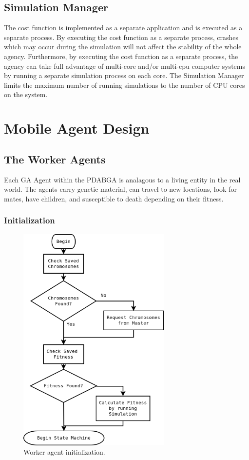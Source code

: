     \subsection{Simulation Manager}
      The cost function is implemented as a separate application and is executed
        as a separate process. 
      By executing the cost function as a separate process, crashes which may occur
        during the simulation will not affect the stability of the whole agency. 
      Furthermore, by executing the cost function as a separate process, the agency
        can take full advantage of multi-core and/or multi-cpu computer systems by
        running a separate simulation process on each core. 
      The Simulation Manager limits the maximum number of running simulations to the
        number of CPU cores on the system.


  \section{Mobile Agent Design}
    \subsection{The Worker Agents}
    Each GA Agent within the PDABGA is analagous to a living entity in the real world.
    The agents carry genetic material, can travel to new locations, look for
      mates, have children, and susceptible to death depending on their fitness.
    \subsubsection{Initialization}
      \begin{figure}[!ht]
      \begin{center}
         \includegraphics[width=3in]{figures/worker_agent_init}
      \end{center}
      \caption{\label{fig:worker_agent_init}Worker agent initialization.}
      \end{figure}

